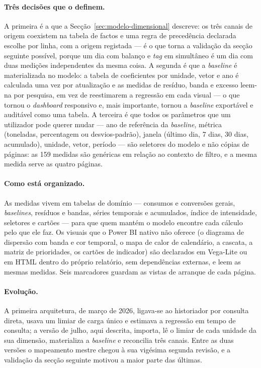 \paragraph{Três decisões que o definem.} A primeira é a que a
Secção~\ref{sec:modelo-dimensional} descreve: os três canais de origem
coexistem na tabela de factos e uma regra de precedência declarada escolhe
por linha, com a origem registada --- é o que torna a validação da secção
seguinte possível, porque um dia com balanço e \emph{tag} em simultâneo é
um dia com duas medições independentes da mesma coisa. A segunda é que a
\emph{baseline} é materializada no modelo: a tabela de coeficientes por
unidade, vetor e ano é calculada uma vez por atualização e as medidas de
resíduo, banda e excesso leem-na por pesquisa, em vez de reestimarem a
regressão em cada visual --- o que tornou o \emph{dashboard} responsivo e,
mais importante, tornou a \emph{baseline} exportável e auditável como uma
tabela. A terceira é que todos os parâmetros que um utilizador pode querer
mudar --- ano de referência da \emph{baseline}, métrica (toneladas,
percentagem ou desvios-padrão), janela (último dia, 7 dias, 30 dias,
acumulado), unidade, vetor, período --- são seletores do modelo e não
cópias de páginas: as 159 medidas são genéricas em relação ao contexto de
filtro, e a mesma medida serve as quatro páginas.

\paragraph{Como está organizado.} As medidas vivem em tabelas de domínio
--- consumos e conversões gerais, \emph{baselines}, resíduos e bandas,
séries temporais e acumulados, índice de intensidade, seletores e cartões
--- para que quem mantém o modelo encontre cada cálculo pelo que ele faz.
Os visuais que o Power BI nativo não oferece (o diagrama de dispersão com
banda e cor temporal, o mapa de calor de calendário, a cascata, a matriz
de prioridades, os cartões de indicador) são declarados em Vega-Lite ou em
HTML dentro do próprio relatório, sem dependências externas, e leem as
mesmas medidas. Seis marcadores guardam as vistas de arranque de cada
página.

\paragraph{Evolução.} A primeira arquitetura, de março de 2026, ligava-se
ao historiador por consulta direta, usava um limiar de carga único e
estimava a regressão em tempo de consulta; a versão de julho, aqui
descrita, importa, lê o limiar de cada unidade da sua dimensão,
materializa a \emph{baseline} e reconcilia três canais. Entre as duas
versões o mapeamento mestre chegou à sua vigésima segunda revisão, e a
validação da secção seguinte motivou a maior parte das últimas.

